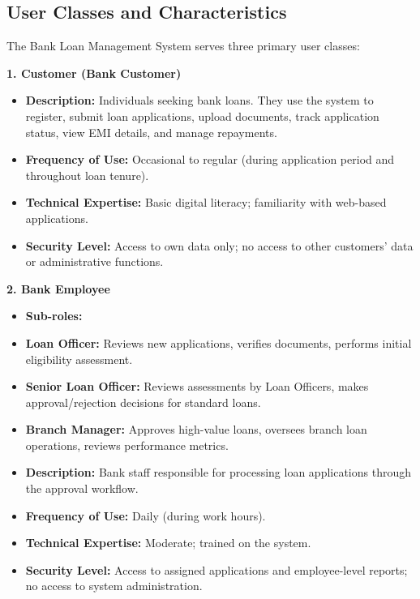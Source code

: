 \documentclass[12pt,a4paper,oneside]{report}
\begin{document}
\subsection{User Classes and Characteristics}

The Bank Loan Management System serves three primary user classes:

\textbf{1. Customer (Bank Customer)}

\begin{itemize}
  \item \textbf{Description:} Individuals seeking bank loans. They use the system to register, submit loan applications, upload documents, track application status, view EMI details, and manage repayments.
  \item \textbf{Frequency of Use:} Occasional to regular (during application period and throughout loan tenure).
  \item \textbf{Technical Expertise:} Basic digital literacy; familiarity with web-based applications.
  \item \textbf{Security Level:} Access to own data only; no access to other customers' data or administrative functions.
\end{itemize}

\textbf{2. Bank Employee}

\begin{itemize}
  \item \textbf{Sub-roles:}
  \item \textbf{Loan Officer:} Reviews new applications, verifies documents, performs initial eligibility assessment.
  \item \textbf{Senior Loan Officer:} Reviews assessments by Loan Officers, makes approval/rejection decisions for standard loans.
  \item \textbf{Branch Manager:} Approves high-value loans, oversees branch loan operations, reviews performance metrics.
  \item \textbf{Description:} Bank staff responsible for processing loan applications through the approval workflow.
  \item \textbf{Frequency of Use:} Daily (during work hours).
  \item \textbf{Technical Expertise:} Moderate; trained on the system.
  \item \textbf{Security Level:} Access to assigned applications and employee-level reports; no access to system administration.
\end{itemize}
\end{document}
